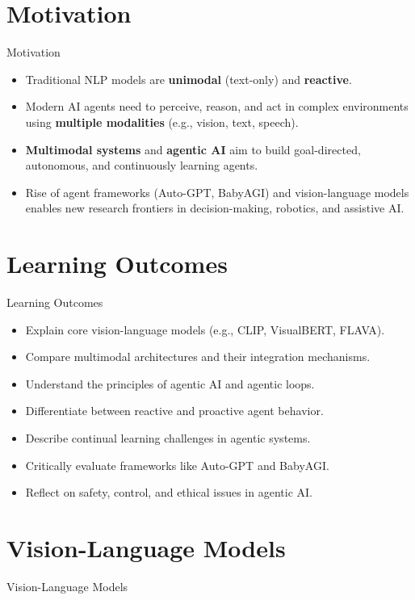 \section{Motivation}
\begin{frame}{Motivation}
        \begin{itemize}
            \setlength{\itemsep}{1em}
            \item Traditional NLP models are \textbf{unimodal} (text-only) and \textbf{reactive}.
            \item Modern AI agents need to perceive, reason, and act in complex environments using \textbf{multiple modalities} (e.g., vision, text, speech).
            \item \textbf{Multimodal systems} and \textbf{agentic AI} aim to build goal-directed, autonomous, and continuously learning agents.
            \item Rise of agent frameworks (Auto-GPT, BabyAGI) and vision-language models enables new research frontiers in decision-making, robotics, and assistive AI.
        \end{itemize}
\end{frame}

\section{Learning Outcomes}
\begin{frame}{Learning Outcomes}
\begin{itemize}
    \setlength{\itemsep}{1em}
    \item Explain core vision-language models (e.g., CLIP, VisualBERT, FLAVA).
    \item Compare multimodal architectures and their integration mechanisms.
    \item Understand the principles of agentic AI and agentic loops.
    \item Differentiate between reactive and proactive agent behavior.
    \item Describe continual learning challenges in agentic systems.
    \item Critically evaluate frameworks like Auto-GPT and BabyAGI.
    \item Reflect on safety, control, and ethical issues in agentic AI.
\end{itemize}
\end{frame}


\section{Vision-Language Models}
\begin{frame}{}
    \LARGE Vision-Language Models
\end{frame}

